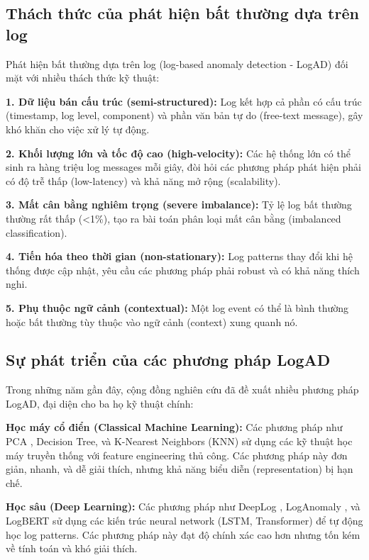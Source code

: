 \subsection{Thách thức của phát hiện bất thường dựa trên log}

Phát hiện bất thường dựa trên log (log-based anomaly detection - LogAD) đối mặt với nhiều thách thức kỹ thuật:

\textbf{1. Dữ liệu bán cấu trúc (semi-structured):} Log kết hợp cả phần có cấu trúc (timestamp, log level, component) và phần văn bản tự do (free-text message), gây khó khăn cho việc xử lý tự động.

\textbf{2. Khối lượng lớn và tốc độ cao (high-velocity):} Các hệ thống lớn có thể sinh ra hàng triệu log messages mỗi giây, đòi hỏi các phương pháp phát hiện phải có độ trễ thấp (low-latency) và khả năng mở rộng (scalability).

\textbf{3. Mất cân bằng nghiêm trọng (severe imbalance):} Tỷ lệ log bất thường thường rất thấp (<1\%), tạo ra bài toán phân loại mất cân bằng (imbalanced classification).

\textbf{4. Tiến hóa theo thời gian (non-stationary):} Log patterns thay đổi khi hệ thống được cập nhật, yêu cầu các phương pháp phải robust và có khả năng thích nghi.

\textbf{5. Phụ thuộc ngữ cảnh (contextual):} Một log event có thể là bình thường hoặc bất thường tùy thuộc vào ngữ cảnh (context) xung quanh nó.

\subsection{Sự phát triển của các phương pháp LogAD}

Trong những năm gần đây, cộng đồng nghiên cứu đã đề xuất nhiều phương pháp LogAD, đại diện cho ba họ kỹ thuật chính:

\textbf{Học máy cổ điển (Classical Machine Learning):} Các phương pháp như PCA \cite{xu2009detecting}, Decision Tree, và K-Nearest Neighbors (KNN) \cite{yu2024lightad} sử dụng các kỹ thuật học máy truyền thống với feature engineering thủ công. Các phương pháp này đơn giản, nhanh, và dễ giải thích, nhưng khả năng biểu diễn (representation) bị hạn chế.

\textbf{Học sâu (Deep Learning):} Các phương pháp như DeepLog \cite{du2017deeplog}, LogAnomaly \cite{meng2019loganomaly}, và LogBERT \cite{guo2021logbert} sử dụng các kiến trúc neural network (LSTM, Transformer) để tự động học log patterns. Các phương pháp này đạt độ chính xác cao hơn nhưng tốn kém về tính toán và khó giải thích.

